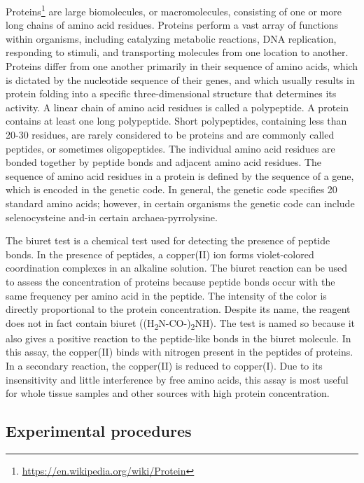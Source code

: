 \documentclass[]{book}
\let\rmarkdownfootnote\footnote%
\def\footnote{\protect\rmarkdownfootnote}
\renewcommand{\href}[2]{#2\footnote{\url{#1}}}
\begin{document}
\href{https://en.wikipedia.org/wiki/Protein}{Proteins} are large biomolecules, or macromolecules, consisting of one or more long chains of amino acid residues. Proteins perform a vast array of functions within organisms, including catalyzing metabolic reactions, DNA replication, responding to stimuli, and transporting molecules from one location to another. Proteins differ from one another primarily in their sequence of amino acids, which is dictated by the nucleotide sequence of their genes, and which usually results in protein folding into a specific three-dimensional structure that determines its activity.
A linear chain of amino acid residues is called a polypeptide. A protein contains at least one long polypeptide. Short polypeptides, containing less than 20-30 residues, are rarely considered to be proteins and are commonly called peptides, or sometimes oligopeptides. The individual amino acid residues are bonded together by peptide bonds and adjacent amino acid residues. The sequence of amino acid residues in a protein is defined by the sequence of a gene, which is encoded in the genetic code. In general, the genetic code specifies 20 standard amino acids; however, in certain organisms the genetic code can include selenocysteine and-in certain archaea-pyrrolysine.

The biuret test is a chemical test used for detecting the presence of peptide bonds. In the presence of peptides, a copper(II) ion forms violet-colored coordination complexes in an alkaline solution. The biuret reaction can be used to assess the concentration of proteins because peptide bonds occur with the same frequency per amino acid in the peptide. The intensity of the color is directly proportional to the protein concentration.
Despite its name, the reagent does not in fact contain biuret ((H\textsubscript{2}N-CO-)\textsubscript{2}NH). The test is named so because it also gives a positive reaction to the peptide-like bonds in the biuret molecule.
In this assay, the copper(II) binds with nitrogen present in the peptides of proteins. In a secondary reaction, the copper(II) is reduced to copper(I). Due to its insensitivity and little interference by free amino acids, this assay is most useful for whole tissue samples and other sources with high protein concentration.

\hypertarget{experimental-procedures-3}{%
\subsection{Experimental procedures}\label{experimental-procedures-3}}
\end{document}
